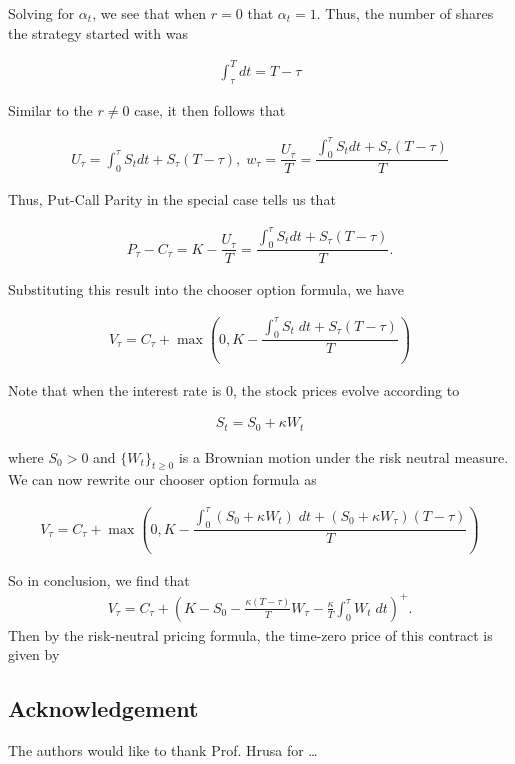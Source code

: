 \documentclass[reqno]{amsart}
\begin{document}
Solving for $\alpha_t$, we see that when $r = 0$ that $\alpha_t = 1$. Thus, the number of shares the strategy started with was

\begin{align}
     \int_\tau^T dt = T - \tau
\end{align}

Similar to the $r \neq 0$ case, it then follows that

\begin{align}
     U_\tau = \int_0^\tau S_t dt + S_\tau (T - \tau), \; w_\tau = \dfrac{U_\tau}{T} = \dfrac{\int_0^\tau S_t dt + S_\tau (T - \tau)}{T}
\end{align}

Thus, Put-Call Parity in the special case tells us that 

\begin{align}
     P_\tau - C_\tau = K - \dfrac{U_\tau}{T} = \dfrac{\int_0^\tau S_t dt + S_\tau (T - \tau)}{T}.
\end{align}

Substituting this result into the chooser option formula, we have

\begin{align}
     V_\tau = C_\tau + \max(0, K - \dfrac{\int_0^\tau S_t \; dt + S_\tau (T - \tau)}{T})
\end{align}

Note that when the interest rate is $0$, the stock prices evolve according to 

\begin{align}
     S_t = S_0 + \kappa W_t
\end{align}

where $S_0 > 0$ and $\{W_t\}_{t \ge 0}$ is a Brownian motion under the risk neutral measure. We can now rewrite our chooser option formula as

\begin{align}
     V_\tau = C_\tau + \max(0, K - \dfrac{\int_0^\tau \left( S_0 + \kappa W_t \right) \; dt + (S_0 + \kappa W_\tau) (T - \tau)}{T})
\end{align}

So in conclusion, we find that 
\begin{align}
     V_\tau = C_\tau + \left(K- S_0 - \frac{\kappa(T-\tau)}{T} W_\tau - \frac{\kappa}{T} \int_0^\tau W_t \; dt  \right)^+.
\end{align}
Then by the risk-neutral pricing formula, the time-zero price of this contract is given by 


\subsection*{Acknowledgement} The authors would like to thank Prof. Hrusa for \dots 

\end{document}
